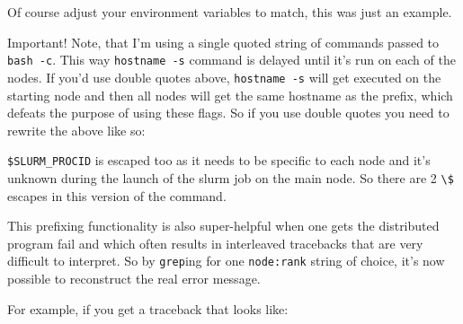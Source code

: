 \documentclass[
]{report}
\newenvironment{Shaded}{\begin{snugshade}}{\end{snugshade}}
\newcommand{\AttributeTok}[1]{\textcolor[rgb]{0.40,0.45,0.13}{#1}}
\newcommand{\DataTypeTok}[1]{\textcolor[rgb]{0.68,0.00,0.00}{#1}}
\newcommand{\ExtensionTok}[1]{\textcolor[rgb]{0.00,0.23,0.31}{#1}}
\newcommand{\NormalTok}[1]{\textcolor[rgb]{0.00,0.23,0.31}{#1}}
\newcommand{\StringTok}[1]{\textcolor[rgb]{0.13,0.47,0.30}{#1}}
\newcommand{\VariableTok}[1]{\textcolor[rgb]{0.07,0.07,0.07}{#1}}
\begin{document}
Of course adjust your environment variables to match, this was just an
example.

Important! Note, that I'm using a single quoted string of commands
passed to \texttt{bash\ -c}. This way \texttt{hostname\ -s} command is
delayed until it's run on each of the nodes. If you'd use double quotes
above, \texttt{hostname\ -s} will get executed on the starting node and
then all nodes will get the same hostname as the prefix, which defeats
the purpose of using these flags. So if you use double quotes you need
to rewrite the above like so:

\begin{Shaded}
\end{Shaded}

\texttt{\$SLURM\_PROCID} is escaped too as it needs to be specific to
each node and it's unknown during the launch of the slurm job on the
main node. So there are 2 \texttt{\textbackslash{}\$} escapes in this
version of the command.

This prefixing functionality is also super-helpful when one gets the
distributed program fail and which often results in interleaved
tracebacks that are very difficult to interpret. So by \texttt{grep}ing
for one \texttt{node:rank} string of choice, it's now possible to
reconstruct the real error message.

For example, if you get a traceback that looks like:
\end{document}
